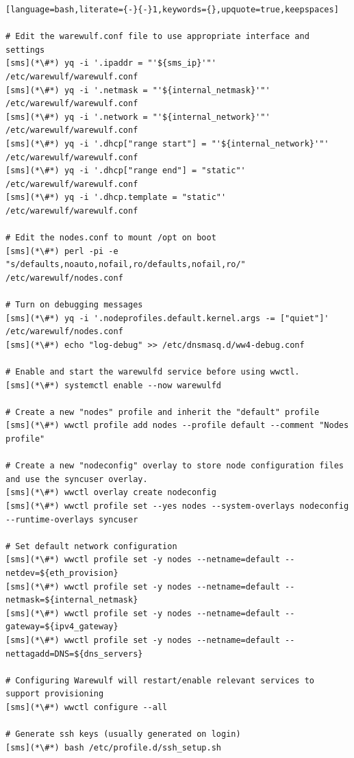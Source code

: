 \begin{lstlisting}[language=bash,literate={-}{-}1,keywords={},upquote=true,keepspaces]

# Edit the warewulf.conf file to use appropriate interface and settings
[sms](*\#*) yq -i '.ipaddr = "'${sms_ip}'"' /etc/warewulf/warewulf.conf
[sms](*\#*) yq -i '.netmask = "'${internal_netmask}'"' /etc/warewulf/warewulf.conf
[sms](*\#*) yq -i '.network = "'${internal_network}'"' /etc/warewulf/warewulf.conf
[sms](*\#*) yq -i '.dhcp["range start"] = "'${internal_network}'"' /etc/warewulf/warewulf.conf
[sms](*\#*) yq -i '.dhcp["range end"] = "static"' /etc/warewulf/warewulf.conf
[sms](*\#*) yq -i '.dhcp.template = "static"' /etc/warewulf/warewulf.conf

# Edit the nodes.conf to mount /opt on boot
[sms](*\#*) perl -pi -e "s/defaults,noauto,nofail,ro/defaults,nofail,ro/" /etc/warewulf/nodes.conf

# Turn on debugging messages
[sms](*\#*) yq -i '.nodeprofiles.default.kernel.args -= ["quiet"]' /etc/warewulf/nodes.conf
[sms](*\#*) echo "log-debug" >> /etc/dnsmasq.d/ww4-debug.conf

# Enable and start the warewulfd service before using wwctl.
[sms](*\#*) systemctl enable --now warewulfd

# Create a new "nodes" profile and inherit the "default" profile
[sms](*\#*) wwctl profile add nodes --profile default --comment "Nodes profile"

# Create a new "nodeconfig" overlay to store node configuration files and use the syncuser overlay.
[sms](*\#*) wwctl overlay create nodeconfig
[sms](*\#*) wwctl profile set --yes nodes --system-overlays nodeconfig --runtime-overlays syncuser

# Set default network configuration
[sms](*\#*) wwctl profile set -y nodes --netname=default --netdev=${eth_provision}
[sms](*\#*) wwctl profile set -y nodes --netname=default --netmask=${internal_netmask}
[sms](*\#*) wwctl profile set -y nodes --netname=default --gateway=${ipv4_gateway}
[sms](*\#*) wwctl profile set -y nodes --netname=default --nettagadd=DNS=${dns_servers}

# Configuring Warewulf will restart/enable relevant services to support provisioning
[sms](*\#*) wwctl configure --all

# Generate ssh keys (usually generated on login)
[sms](*\#*) bash /etc/profile.d/ssh_setup.sh
\end{lstlisting}
